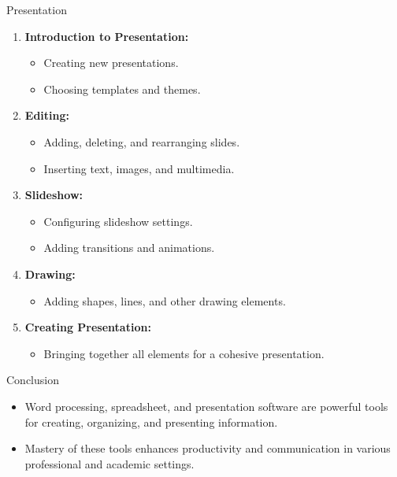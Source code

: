\begin{frame}{Presentation}
  \begin{enumerate}
    \item \textbf{Introduction to Presentation:}
      \begin{itemize}
        \item Creating new presentations.
        \item Choosing templates and themes.
      \end{itemize}
    \item \textbf{Editing:}
      \begin{itemize}
        \item Adding, deleting, and rearranging slides.
        \item Inserting text, images, and multimedia.
      \end{itemize}
    \item \textbf{Slideshow:}
      \begin{itemize}
        \item Configuring slideshow settings.
        \item Adding transitions and animations.
      \end{itemize}
    \item \textbf{Drawing:}
      \begin{itemize}
        \item Adding shapes, lines, and other drawing elements.
      \end{itemize}
    \item \textbf{Creating Presentation:}
      \begin{itemize}
        \item Bringing together all elements for a cohesive presentation.
      \end{itemize}
  \end{enumerate}
\end{frame}

\begin{frame}{Conclusion}
  \begin{itemize}
    \item Word processing, spreadsheet, and presentation software are powerful tools for creating, organizing, and presenting information.
    \item Mastery of these tools enhances productivity and communication in various professional and academic settings.
  \end{itemize}
\end{frame}
